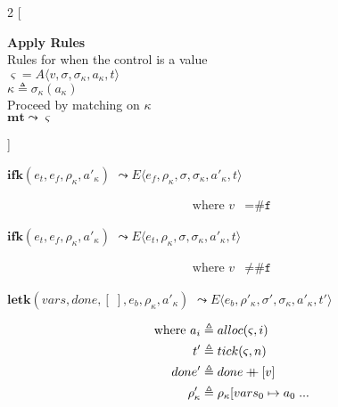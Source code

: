 \documentclass[12pt,draft]{article}
\newcommand\mdoubleplus{\ensuremath{\mathbin{+\mkern-9mu+}}}
\newcommand{\falsesyn}{\texttt{\#f}}
\begin{document}
\begin{multicols*}{2}
[
\begin{center}
\textbf{Apply Rules} \\
Rules for when the control is a value \\
$\varsigma = A\langle v , \sigma , \sigma_\kappa , a_\kappa , t \rangle$ \\
$\kappa \triangleq \sigma_\kappa(a_\kappa)$ \\
Proceed by matching on $\kappa$ \\
\vspace{5mm}
$\textbf{mt} \leadsto \varsigma$
\end{center}
\vspace{-5mm}
]
\begin{center}
  $\textbf{ifk}(e_t, e_f, \rho_\kappa , a'_\kappa)$
  $\leadsto E\langle e_f , \rho_\kappa , \sigma , \sigma_\kappa , a'_\kappa , t \rangle$
\end{center}
\vspace{-7mm}
\begin{align*}
\text{where } v &= \falsesyn
\end{align*}
\begin{center}
  $\textbf{ifk}(e_t, e_f, \rho_\kappa , a'_\kappa)$
  $\leadsto E\langle e_t , \rho_\kappa , \sigma , \sigma_\kappa , a'_\kappa , t \rangle$
\end{center}
\vspace{-7mm}
\begin{align*}
\text{where } v &\not= \falsesyn
\end{align*}
\begin{center}
  $\textbf{letk}(vars, done, [\;], e_b, \rho_\kappa , a'_\kappa)$
  $\leadsto E\langle e_b , \rho'_\kappa , \sigma' , \sigma_\kappa , a'_\kappa , t' \rangle $
\end{center}
\vspace{-7mm}
\begin{align*}
  \text{where } a_i &\triangleq alloc(\varsigma, i) \\
  t' &\triangleq tick(\varsigma, n) \\
  done' &\triangleq done \mdoubleplus [v] \\
  \rho'_{\kappa} &\triangleq \rho_{\kappa}[vars_0 \mapsto a_0\;...\\

\end{align*}
\end{multicols*}
\end{document}
